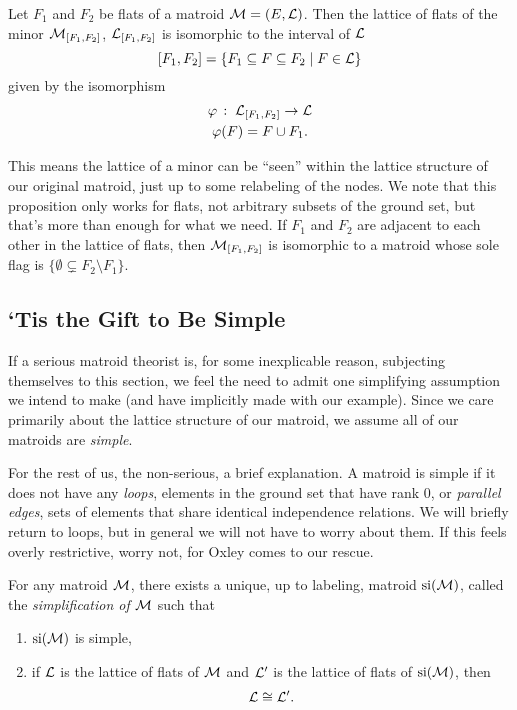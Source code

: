 \documentclass[12pt,oneside]{../../sfsuthesis}
\begin{document}
\begin{proposition}\th\label{thm:minorLattice}
    Let \( F_1 \) and \( F_2 \) be flats of a matroid \( \mathcal{M} = (E, \mathcal{L})\).
    Then the lattice of flats of the minor \( \mathcal{M}_{[F_1, F_2]} \), \( \mathcal{L}_{[F_1, F_2]} \) is isomorphic to the interval of \( \mathcal{L} \)
    \[
        [F_1, F_2] = \{ F_1 \subseteq F \subseteq F_2 \; | \; F \in \mathcal{L} \}
    \]
    given by the isomorphism
    \begin{gather*}
        \varphi\,:\; \mathcal{L}_{[F_1, F_2]} \to \mathcal{L} \\
        \varphi(F) = F \cup F_1.
    \end{gather*}
\end{proposition}

This means the lattice of a minor can be ``seen'' within the lattice structure of our original matroid, just up to some relabeling of the nodes.
We note that this proposition only works for flats, not arbitrary subsets of the ground set, but that's more than enough for what we need.
If \( F_1 \) and \( F_2 \) are adjacent to each other in the lattice of flats, then \( \mathcal{M}_{[F_1, F_2]} \) is isomorphic to a matroid whose sole flag is \( \{ \emptyset \subsetneq F_2 \setminus F_1 \} \).


\subsection{`Tis the Gift to Be Simple}

If a serious matroid theorist is, for some inexplicable reason, subjecting themselves to this section, we feel the need to admit one simplifying assumption we intend to make (and have implicitly made with our example).
Since we care primarily about the lattice structure of our matroid, we assume all of our matroids are \emph{simple}.

For the rest of us, the non-serious, a brief explanation.
A matroid is simple if it does not have any \emph{loops}, elements in the ground set that have rank 0, or \emph{parallel edges}, sets of elements that share identical independence relations.
We will briefly return to loops, but in general we will not have to worry about them.
If this feels overly restrictive, worry not, for Oxley\cite[p.~49]{oxleyMatroidTheory2011} comes to our rescue.
\begin{proposition}\th\label{thm:simplificationLattice}
    For any matroid \( \mathcal{M} \), there exists a unique, up to labeling, matroid \( \operatorname{si}(\mathcal{M}) \), called the \emph{simplification of \( \mathcal{M} \)}
    such that
    \begin{enumerate}[label=\roman*.]
        \item \( \operatorname{si}(\mathcal{M}) \) is simple,
        \item if \( \mathcal{L} \) is the lattice of flats of \( \mathcal{M} \) and \( \mathcal{L}' \) is the lattice of flats of \( \operatorname{si}(\mathcal{M}) \), then
              \[
                  \mathcal{L} \cong \mathcal{L}'.
              \]
    \end{enumerate}
\end{proposition}
\end{document}
